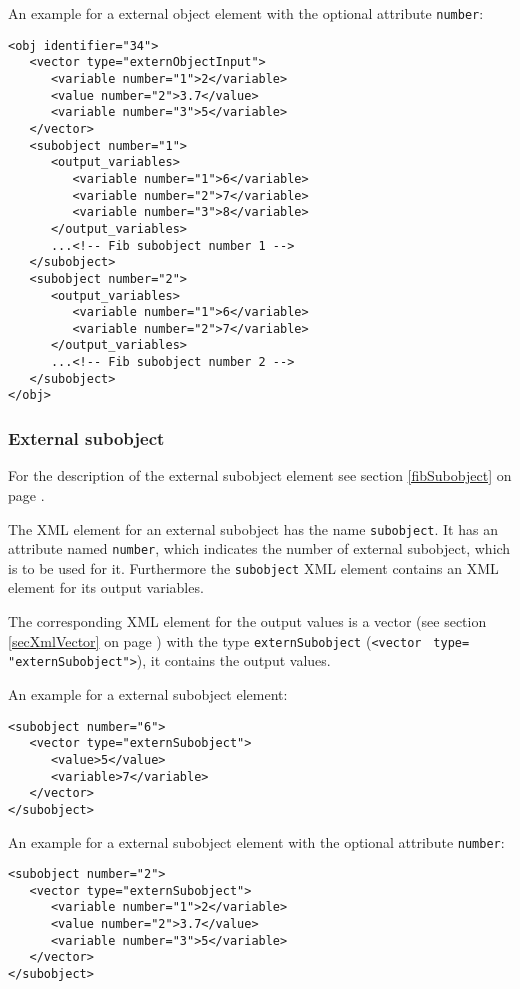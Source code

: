 \noindent
An example for a external object element with the optional attribute \verb|number|:
\begin{verbatim}
<obj identifier="34">
   <vector type="externObjectInput">
      <variable number="1">2</variable>
      <value number="2">3.7</value>
      <variable number="3">5</variable>
   </vector>
   <subobject number="1">
      <output_variables>
         <variable number="1">6</variable>
         <variable number="2">7</variable>
         <variable number="3">8</variable>
      </output_variables>
      ...<!-- Fib subobject number 1 -->
   </subobject>
   <subobject number="2">
      <output_variables>
         <variable number="1">6</variable>
         <variable number="2">7</variable>
      </output_variables>
      ...<!-- Fib subobject number 2 -->
   </subobject>
</obj>
\end{verbatim}



\subsubsection{External subobject}

For the description of the external subobject element see section \ref{fibSubobject} on page \pageref{fibSubobject} .

The XML element for an external subobject has the name \verb|subobject|. It has an attribute named \verb|number|, which indicates the number of external subobject, which is to be used for it. Furthermore the \verb|subobject| XML element contains an XML element for its output variables.

The corresponding XML element for the output values is a vector (see section \ref{secXmlVector} on page \pageref{secXmlVector}) with the type \verb|externSubobject| (\verb|<vector | \verb|type=| \verb|"externSubobject">|), it contains the output values.

\bigskip\noindent
An example for a external subobject element:
\begin{verbatim}
<subobject number="6">
   <vector type="externSubobject">
      <value>5</value>
      <variable>7</variable>
   </vector>
</subobject>
\end{verbatim}

\noindent
An example for a external subobject element with the optional attribute \verb|number|:
\begin{verbatim}
<subobject number="2">
   <vector type="externSubobject">
      <variable number="1">2</variable>
      <value number="2">3.7</value>
      <variable number="3">5</variable>
   </vector>
</subobject>
\end{verbatim}

